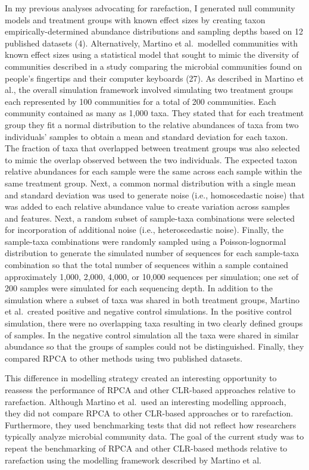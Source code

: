 \documentclass[
  11pt,
]{article}
\begin{document}
In my previous analyses advocating for rarefaction, I generated null
community models and treatment groups with known effect sizes by
creating taxon empirically-determined abundance distributions and
sampling depths based on 12 published datasets (4). Alternatively,
Martino et al.~modelled communities with known effect sizes using a
statistical model that sought to mimic the diversity of communities
described in a study comparing the microbial communities found on
people's fingertips and their computer keyboards (27). As described in
Martino et al., the overall simulation framework involved simulating two
treatment groups each represented by 100 communities for a total of 200
communities. Each community contained as many as 1,000 taxa. They stated
that for each treatment group they fit a normal distribution to the
relative abundances of taxa from two individuals' samples to obtain a
mean and standard deviation for each taxon. The fraction of taxa that
overlapped between treatment groups was also selected to mimic the
overlap observed between the two individuals. The expected taxon
relative abundances for each sample were the same across each sample
within the same treatment group. Next, a common normal distribution with
a single mean and standard deviation was used to generate noise (i.e.,
homoscedastic noise) that was added to each relative abundance value to
create variation across samples and features. Next, a random subset of
sample-taxa combinations were selected for incorporation of additional
noise (i.e., heteroscedastic noise). Finally, the sample-taxa
combinations were randomly sampled using a Poisson-lognormal
distribution to generate the simulated number of sequences for each
sample-taxa combination so that the total number of sequences within a
sample contained approximately 1,000, 2,000, 4,000, or 10,000 sequences
per simulation; one set of 200 samples were simulated for each
sequencing depth. In addition to the simulation where a subset of taxa
was shared in both treatment groups, Martino et al.~created positive and
negative control simulations. In the positive control simulation, there
were no overlapping taxa resulting in two clearly defined groups of
samples. In the negative control simulation all the taxa were shared in
similar abundance so that the groups of samples could not be
distinguished. Finally, they compared RPCA to other methods using two
published datasets.

This difference in modelling strategy created an interesting opportunity
to reassess the performance of RPCA and other CLR-based approaches
relative to rarefaction. Although Martino et al.~used an interesting
modelling approach, they did not compare RPCA to other CLR-based
approaches or to rarefaction. Furthermore, they used benchmarking tests
that did not reflect how researchers typically analyze microbial
community data. The goal of the current study was to repeat the
benchmarking of RPCA and other CLR-based methods relative to rarefaction
using the modelling framework described by Martino et al.
\end{document}
